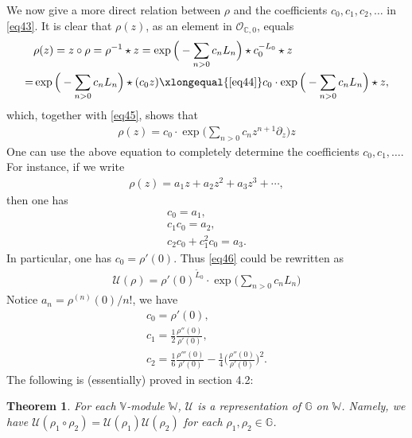 \documentclass[12pt,b5paper,notitlepage]{report}
\theoremstyle{definition}
\theoremstyle{plain}
\newtheorem{thm}[df]{Theorem}
\newcommand{\mc}{\mathcal}
\newcommand{\wtd}{\widetilde}
\newcommand{\scr}{\mathscr}
\newcommand{\Vbb}{\mathbb V}
\newcommand{\Wbb}{\mathbb W}
\newcommand{\Gbb}{\mathbb G}
\newcommand{\Cbb}{\mathbb C}
\numberwithin{equation}{section}
\begin{document}
We now give a more direct relation between $\rho$ and the coefficients $c_0,c_1,c_2,\dots$ in \eqref{eq43}. It is clear that $\rho(z)$, as an element in $\scr O_{\Cbb,0}$, equals
\begin{align*}
&\rho(z)=z\circ\rho=\rho^{-1}\star z=\exp\Big(-\sum_{n>0}c_n L_n\Big)\star c_0^{-L_0}\star z\\
=&\exp\Big(-\sum_{n>0}c_n L_n\Big)\star (c_0z) \xlongequal{\eqref{eq44}} c_0\cdot \exp\Big(-\sum_{n>0}c_n L_n\Big)\star z,
\end{align*}
which, together with \eqref{eq45}, shows that
\begin{align}
\boxed{\rho(z)=c_0\cdot \exp\Big(\sum_{n>0}c_n z^{n+1}\partial_z \Big) z}
\end{align}
One can use the above equation to completely determine the coefficients $c_0,c_1,\dots$. For instance, if we write
\begin{align}
\rho(z)=a_1z+a_2z^2+a_3z^3+\cdots,\label{eq48}
\end{align}
then one has
\begin{gather}
c_0=a_1,\nonumber\\
c_1c_0=a_2,\nonumber\\
c_2c_0+c_1^2c_0=a_3.\nonumber
\end{gather}
In particular, one has $c_0=\rho'(0)$. Thus \eqref{eq46} could be rewritten as
\begin{align}
\boxed{\mc U(\rho)=\rho'(0)^{\wtd L_0}\cdot \exp\Big(\sum_{n>0}c_n L_n\Big)}\label{eq47}
\end{align}
Notice $a_n=\rho^{(n)}(0)/n!$, we have
\begin{gather}
c_0=\rho'(0),\nonumber\\
c_1=\frac 12\frac{\rho''(0)}{\rho'(0)},\nonumber\\
c_2=\frac 16 \frac{\rho'''(0)}{\rho'(0)}-\frac 14\Big(\frac{\rho''(0)}{\rho'(0)}\Big)^2.\label{eq165}
\end{gather}
The following is (essentially) proved in \cite{Hua97} section 4.2:
\begin{thm}
For each $\Vbb$-module $\Wbb$, $\mc U$ is a representation of $\Gbb$ on $\Wbb$. Namely, we have $\mc U(\rho_1\circ\rho_2)=\mc U(\rho_1)\mc U(\rho_2)$ for each $\rho_1,\rho_2\in\Gbb$.
\end{thm}
\end{document}
